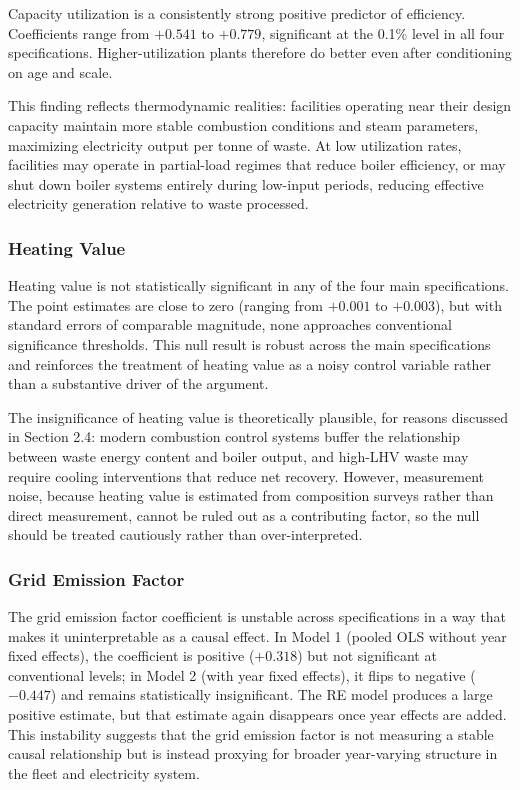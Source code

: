 \documentclass[12pt,a4paper]{article}
\begin{document}
Capacity utilization is a consistently strong positive predictor of efficiency. Coefficients range from $+0.541$ to $+0.779$, significant at the 0.1\% level in all four specifications. Higher-utilization plants therefore do better even after conditioning on age and scale.

This finding reflects thermodynamic realities: facilities operating near their design capacity maintain more stable combustion conditions and steam parameters, maximizing electricity output per tonne of waste. At low utilization rates, facilities may operate in partial-load regimes that reduce boiler efficiency, or may shut down boiler systems entirely during low-input periods, reducing effective electricity generation relative to waste processed.

\subsubsection{Heating Value}

Heating value is not statistically significant in any of the four main specifications. The point estimates are close to zero (ranging from $+0.001$ to $+0.003$), but with standard errors of comparable magnitude, none approaches conventional significance thresholds. This null result is robust across the main specifications and reinforces the treatment of heating value as a noisy control variable rather than a substantive driver of the argument.

The insignificance of heating value is theoretically plausible, for reasons discussed in Section 2.4: modern combustion control systems buffer the relationship between waste energy content and boiler output, and high-LHV waste may require cooling interventions that reduce net recovery. However, measurement noise, because heating value is estimated from composition surveys rather than direct measurement, cannot be ruled out as a contributing factor, so the null should be treated cautiously rather than over-interpreted.

\subsubsection{Grid Emission Factor}

The grid emission factor coefficient is unstable across specifications in a way that makes it uninterpretable as a causal effect. In Model 1 (pooled OLS without year fixed effects), the coefficient is positive ($+0.318$) but not significant at conventional levels; in Model 2 (with year fixed effects), it flips to negative ($-0.447$) and remains statistically insignificant. The RE model produces a large positive estimate, but that estimate again disappears once year effects are added. This instability suggests that the grid emission factor is not measuring a stable causal relationship but is instead proxying for broader year-varying structure in the fleet and electricity system.
\end{document}
